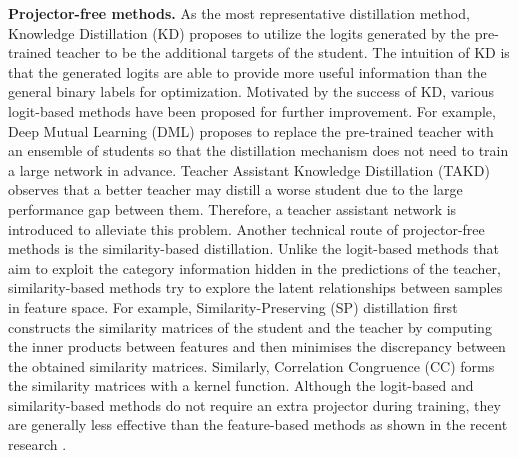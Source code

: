 \documentclass{article}
\begin{document}
\textbf{Projector-free methods.} As the most representative distillation method, Knowledge Distillation (KD) \cite{kd} proposes to utilize the logits generated by the pre-trained teacher to be the additional targets of the student. The intuition of KD is that the generated logits are able to provide more useful information than the general binary labels for optimization. Motivated by the success of KD, various logit-based methods have been proposed for further improvement. For example, Deep Mutual Learning (DML) \cite{dml} proposes to replace the pre-trained teacher with an ensemble of students so that the distillation mechanism does not need to train a large network in advance. Teacher Assistant Knowledge Distillation (TAKD) \cite{takd} observes that a better teacher may distill a worse student due to the large performance gap between them. Therefore, a teacher assistant network is introduced to alleviate this problem. Another technical route of projector-free methods is the similarity-based distillation. Unlike the logit-based methods that aim to exploit the category information hidden in the predictions of the teacher, similarity-based methods try to explore the latent relationships between samples in feature space. For example, Similarity-Preserving (SP) \cite{sp} distillation first constructs the similarity matrices of the student and the teacher by computing the inner products between features and then minimises the discrepancy between the obtained similarity matrices. Similarly, Correlation Congruence (CC) \cite{cc} forms the similarity matrices with a kernel function. Although the logit-based and similarity-based methods do not require an extra projector during training, they are generally less effective than the feature-based methods as shown in the recent research \cite{cid,srrl}.  
\end{document}
